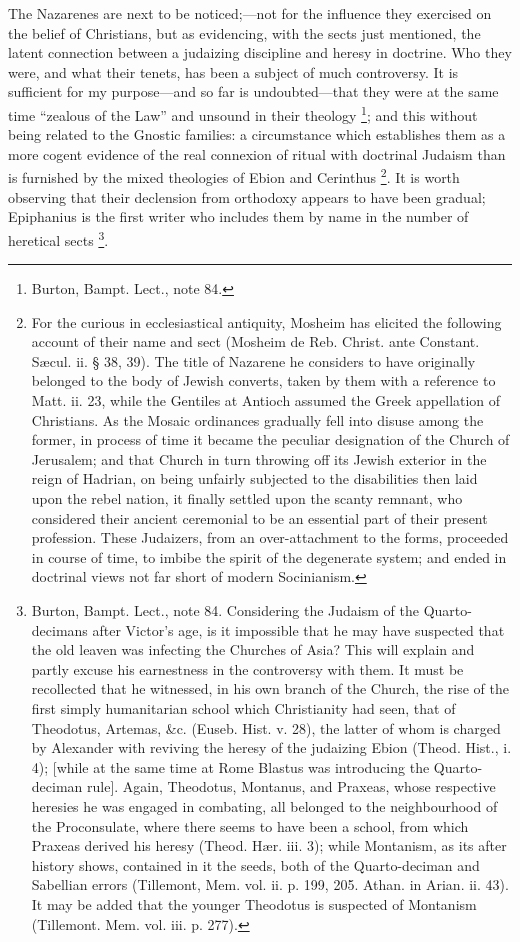 The Nazarenes are next to be noticed;—not for the influence they
exercised on the belief of Christians, but as evidencing, with the
sects just mentioned, the latent connection between a judaizing
discipline and heresy in doctrine. Who they were, and what their
tenets, has been a subject of much controversy. It is sufficient for
my purpose—and so far is undoubted—that they were at the same time
``zealous of the Law'' and unsound in their theology \footnote{Burton, Bampt. Lect., note 84.}; and this without being related to the Gnostic families: a
circumstance which establishes them as a more cogent evidence of the
real connexion of ritual with doctrinal Judaism than is furnished by
the mixed theologies of Ebion and Cerinthus \footnote{For the curious in ecclesiastical
antiquity, Mosheim has elicited the following account of their name
and sect (Mosheim de Reb. Christ. ante Constant. Sæcul. ii. § 38,
39). The title of Nazarene he considers to have originally belonged to
the body of Jewish converts, taken by them with a reference to Matt.
ii. 23, while the Gentiles at Antioch assumed the Greek appellation of
Christians. As the Mosaic ordinances gradually fell into disuse among
the former, in process of time it became the peculiar designation of
the Church of Jerusalem; and that Church in turn throwing off its
Jewish exterior in the reign of Hadrian, on being unfairly subjected
to the disabilities then laid upon the rebel nation, it finally
settled upon the scanty remnant, who considered their ancient
ceremonial to be an essential part of their present profession. These
Judaizers, from an over-attachment to the forms, proceeded in course
of time, to imbibe the spirit of the degenerate system; and ended in
doctrinal views not far short of modern Socinianism.}. It is worth observing that their declension from orthodoxy
appears to have been gradual; Epiphanius is the first writer who
includes them by name in the number of heretical sects \footnote{Burton, Bampt. Lect., note 84. Considering
the Judaism of the Quarto-decimans after Victor's age, is it
impossible that he may have suspected that the old leaven was
infecting the Churches of Asia? This will explain and partly excuse
his earnestness in the controversy with them. It must be recollected
that he witnessed, in his own branch of the Church, the rise of the
first simply humanitarian school which Christianity had seen, that of
Theodotus, Artemas, \&c. (Euseb. Hist. v. 28), the latter of whom
is charged by Alexander with reviving the heresy of the judaizing
Ebion (Theod. Hist., i. 4); [while at the same time at Rome Blastus
was introducing the Quarto-deciman rule]. Again, Theodotus, Montanus,
and Praxeas, whose respective heresies he was engaged in combating,
all belonged to the neighbourhood of the Proconsulate, where there
seems to have been a school, from which Praxeas derived his heresy (Theod.
Hær. iii. 3); while Montanism, as its after history shows, contained
in it the seeds, both of the Quarto-deciman and Sabellian errors (Tillemont,
Mem. vol. ii. p. 199, 205. Athan. in Arian. ii. 43). It may be added
that the younger Theodotus is suspected of Montanism (Tillemont. Mem.
vol. iii. p. 277).}.

